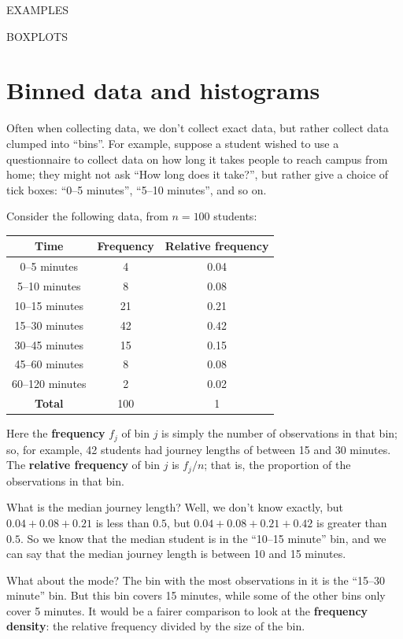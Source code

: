 \documentclass[
  a4paper,
]{book}
\theoremstyle{definition}
\theoremstyle{definition}
\theoremstyle{definition}
\theoremstyle{remark}
\begin{document}
EXAMPLES

BOXPLOTS

\hypertarget{binned}{%
\section{Binned data and histograms}\label{binned}}

Often when collecting data, we don't collect exact data, but rather collect data clumped into ``bins''. For example, suppose a student wished to use a questionnaire to collect data on how long it takes people to reach campus from home; they might not ask ``How long does it take?'', but rather give a choice of tick boxes: ``0--5 minutes'', ``5--10 minutes'', and so on.

Consider the following data, from \(n = 100\) students:

\begin{longtable}[]{@{}ccc@{}}
\toprule
Time & Frequency & Relative frequency \\
\midrule
\endhead
0--5 minutes & 4 & 0.04 \\
5--10 minutes & 8 & 0.08 \\
10--15 minutes & 21 & 0.21 \\
15--30 minutes & 42 & 0.42 \\
30--45 minutes & 15 & 0.15 \\
45--60 minutes & 8 & 0.08 \\
60--120 minutes & 2 & 0.02 \\
\textbf{Total} & 100 & 1 \\
\bottomrule
\end{longtable}

Here the \textbf{frequency} \(f_j\) of bin \(j\) is simply the number of observations in that bin; so, for example, 42 students had journey lengths of between 15 and 30 minutes. The \textbf{relative frequency} of bin \(j\) is \(f_j/n\); that is, the proportion of the observations in that bin.

What is the median journey length? Well, we don't know exactly, but \(0.04 + 0.08 + 0.21\) is less than \(0.5\), but \(0.04 + 0.08 + 0.21 + 0.42\) is greater than \(0.5\). So we know that the median student is in the ``10--15 minute'' bin, and we can say that the median journey length is between 10 and 15 minutes.

What about the mode? The bin with the most observations in it is the ``15--30 minute'' bin. But this bin covers 15 minutes, while some of the other bins only cover 5 minutes. It would be a fairer comparison to look at the \textbf{frequency density}: the relative frequency divided by the size of the bin.
\end{document}

